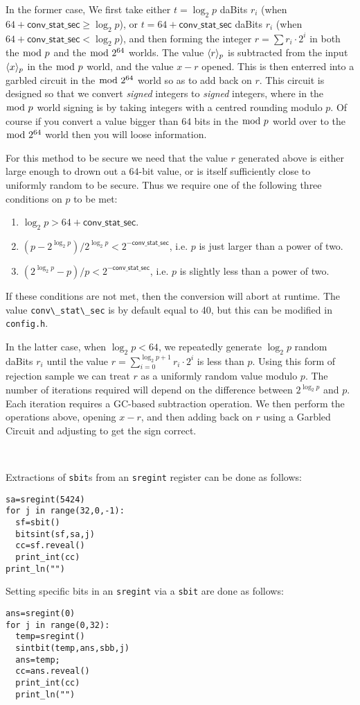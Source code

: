 In the former case, We first take either $t=\log_2 p$ daBits $r_i$
(when $64+\mathsf{conv\_stat\_sec} \ge \log_2 p$),
or $t=64+\mathsf{conv\_stat\_sec}$ daBits $r_i$
(when $64+\mathsf{conv\_stat\_sec}<\log_2 p$),
and then forming the integer $r = \sum r_i \cdot 2^i$
in both the $\bmod \; p$ and the $\bmod \; 2^{64}$ worlds.
The value $\langle r \rangle_p$ is subtracted from the input $\langle x \rangle_p$ in
the $\bmod \; p$ world, and the value $x-r$ opened.
This is then enterred into a garbled circuit in the $\bmod \; 2^{64}$ world so as to add back on $r$.
This circuit is designed so that we convert {\it signed}  integers to {\it signed}
integers, where in the $\bmod \; p$ world signing is by taking integers with a centred
rounding modulo $p$.
Of course if you convert a value bigger than $64$ bits in the $\bmod \; p$ world over to the $\bmod \; 2^{64}$
world then you will loose information.

For this method to be secure we need that the value $r$ generated above is
either large enough to drown out a $64$-bit value, or is itself sufficiently close
to uniformly random to be secure.
Thus we require one of the following three conditions on $p$ to be met:
\begin{enumerate}
  \item $\log_2 p > 64+ \mathsf{conv\_stat\_sec}$.
  \item $(p - 2^{\log_2 p}) / 2^{\log_2 p} < 2^{-\mathsf{conv\_stat\_sec}}$, i.e. $p$ is just larger than a power of two.
  \item $(2^{\log_2 p}-p) / p < 2^{-\mathsf{conv\_stat\_sec}}$, i.e. $p$ is slightly less than a power of two.
\end{enumerate}
If these conditions are not met, then the conversion will abort at runtime.
The value \verb|conv\_stat\_sec| is by default equal to 40, but this can be modified in
\verb|config.h|.

In the latter case, when $\log_2 p < 64$, we repeatedly generate
$\log_2 p$ random daBits $r_i$ until the value
$r = \sum_{i=0}^{\log_2 p+1} r_i \cdot 2^i$ is less than $p$.
Using this form of rejection sample we can treat $r$ as a uniformly
random value modulo $p$.
The number of iterations required will depend on the difference between
$2^{\log_2 p}$ and $p$.
Each iteration requires a GC-based subtraction operation.
We then perform the operations above, opening $x-r$, and then adding back on $r$
using a Garbled Circuit and adjusting to get the sign correct.

~

Extractions of \verb|sbit|s from an \verb|sregint| register can be done as follows:
\begin{lstlisting}
sa=sregint(5424)
for j in range(32,0,-1):
  sf=sbit()
  bitsint(sf,sa,j)
  cc=sf.reveal()
  print_int(cc)
print_ln("")
\end{lstlisting}
Setting specific bits in an \verb|sregint| via a \verb|sbit| are done as follows:
\begin{lstlisting}
ans=sregint(0)
for j in range(0,32):
  temp=sregint()
  sintbit(temp,ans,sbb,j)
  ans=temp;
  cc=ans.reveal()
  print_int(cc)
  print_ln("")
\end{lstlisting}


